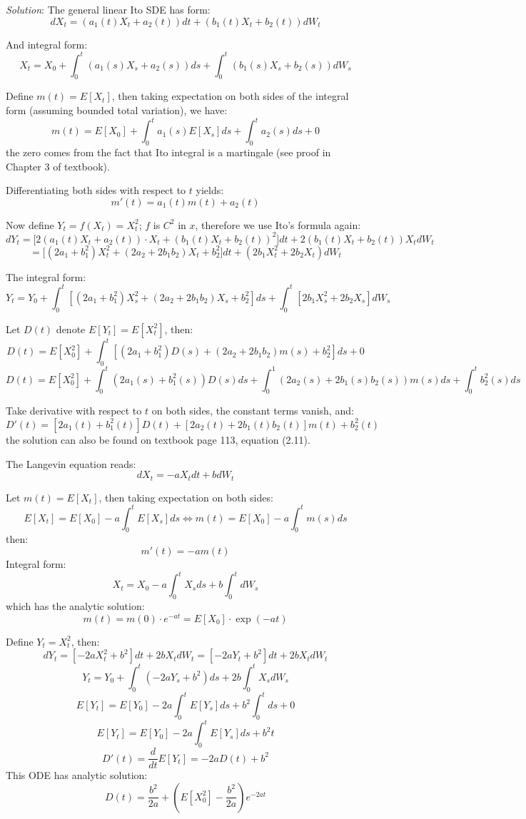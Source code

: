 \documentclass{article}
\begin{document}
\emph{Solution}: The general linear Ito SDE has form:
$$
    dX_t = (a_1(t)X_t+a_2(t))dt + (b_1(t)X_t+b_2(t))dW_t
$$ 

And integral form:
$$
    X_t = X_0 + \int_0^t(a_1(s)X_s + a_2(s))ds + \int_0^t(b_1(s)X_s + b_2(s))dW_s
$$

Define $m(t) = E[X_t]$, then taking expectation on both sides of the integral form (assuming bounded total variation), we have:
$$
    m(t) = E[X_0] + \int_0^ta_1(s)E[X_s]ds + \int_0^ta_2(s)ds + 0
$$ the zero comes from the fact that Ito integral is a martingale (see proof in Chapter 3 of textbook).

Differentiating both sides with respect to $t$ yields:
$$
    m'(t)  = a_1(t)m(t) + a_2(t)
$$

Now define $Y_t = f(X_t) = X_t^2$; $f$ is $C^2$ in $x$, therefore we use Ito's formula again:
$$
    dY_t = \bigg[
     2(a_1(t)X_t + a_2(t))\cdot X_t + (b_1(t)X_t+b_2(t))^2
    \bigg]dt + 2(b_1(t)X_t+b_2(t))X_tdW_t
$$
$$
    = \bigg[
        (2a_1 + b_1^2)X_t^2 + (2a_2 + 2b_1b_2)X_t + b_2^2
    \bigg]dt + (2b_1X_t^2 + 2b_2X_t)dW_t
$$

The integral form:
$$
    Y_t = Y_0 + \int_0^t[(2a_1+b_1^2)X_s^2 + (2a_2 + 2b_1b_2)X_s +b_2^2]ds + \int_0^t[2b_1X_s^2 + 2b_2X_s]dW_s
$$

Let $D(t)$ denote $E[Y_t] = E[X_t^2]$, then:
$$
    D(t) = E[X_0^2] + \int_0^t[(2a_1+b_1^2)D(s) + (2a_2+2b_1b_2)m(s) + b_2^2]ds + 0
$$
$$
    D(t) = E[X_0^2] + \int_0^t(2a_1(s) + b_1^2(s))D(s)ds + \int_0^1(2a_2(s) + 2b_1(s)b_2(s))m(s)ds + \int_0^tb_2^2(s)ds
$$

Take derivative with respect to $t$ on both sides, the constant terms vanish, and:
$$
    D'(t) = [2a_1(t) + b_1^2(t)]D(t) + [2a_2(t) + 2b_1(t)b_2(t)]m(t) + b_2^2(t)
$$ the solution can also be found on textbook page 113, equation (2.11).

The Langevin equation reads:
$$
    dX_t = -aX_tdt + bdW_t
$$

Let $m(t) = E[X_t]$, then taking expectation on both sides:
$$
    E[X_t] = E[X_0] - a\int_0^tE[X_s]ds\Leftrightarrow m(t) = E[X_0] - a\int_0^tm(s)ds 
$$ then:
$$
    m'(t) = -am(t)
$$
Integral form:
$$
    X_t = X_0-a\int_0^tX_sds + b\int_0^tdW_s
$$ which has the analytic solution:
$$
    m(t) = m(0)\cdot e^{-at} = E[X_0]\cdot \exp(-at)
$$

Define $Y_t = X_t^2$, then:
$$
    dY_t = [-2aX_t^2 + b^2]dt + 2bX_tdW_t = [-2aY_t + b^2]dt + 2bX_tdW_t
$$
$$
    Y_t = Y_0 + \int_0^t(-2aY_s + b^2)ds + 2b\int_0^tX_sdW_s
$$
$$
    E[Y_t] = E[Y_0] -2a\int_0^tE[Y_s]ds + b^2\int_0^tds + 0
$$
$$
    E[Y_t] = E[Y_0] - 2a\int_0^tE[Y_s]ds + b^2t
$$
$$
    D'(t) = \frac{d}{dt}E[Y_t] = -2aD(t) + b^2
$$
This ODE has analytic solution:
$$
    D(t) = \frac{b^2}{2a} + (E[X_0^2] - \frac{b^2}{2a})e^{-2at}
$$
\end{document}
